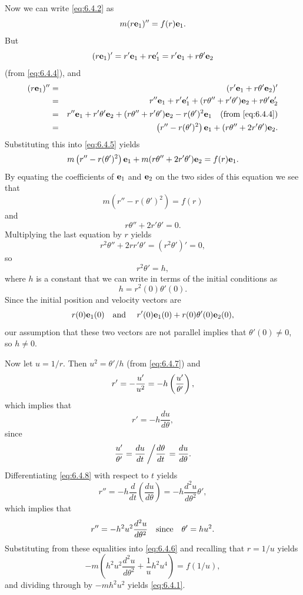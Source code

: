 Now we can write \eqref{eq:6.4.2} as
\begin{equation}
  \label{eq:6.4.5}m(r{\bf e}_{1})''=f(r){\bf e}_{1}.
\end{equation}
But
\[
  (r{\bf e}_{1})'=r'{\bf e}_{1}+r{\bf e}_{1}'=r'{\bf e}_{1}+r\theta'{\bf e}_{2}
\]
(from \eqref{eq:6.4.4}), and
\begin{eqnarray*}
  (r{\bf e}_{1})'' & = & (r'{\bf e}_{1}+r\theta'{\bf e}_{2})'                                                                                               \\
                   & = & r''{\bf e}_{1}+r'{\bf e}_{1}'+(r\theta''+r'\theta'){\bf e}_{2}+r\theta'{\bf e}_{2}'                                                \\
                   & = & r''{\bf e}_{1}+r'\theta'{\bf e}_{2}+(r\theta''+r'\theta'){\bf e}_{2}-r(\theta')^{2}{\bf e}_{1}\mbox{\quad (from \eqref{eq:6.4.4})} \\
                   & = & \left(r''-r(\theta')^{2}\right){\bf e}_{1}+(r\theta''+2r'\theta'){\bf e}_{2}.
\end{eqnarray*}
Substituting this into \eqref{eq:6.4.5} yields
\[
  m\left(r''-r(\theta')^{2}\right){\bf e}_{1}+m(r\theta''+2r'\theta'){\bf e}_{2}=f(r){\bf e}_{1}.
\]
By equating the coefficients of ${\bf e}_{1}$ and ${\bf e}_{2}$ on the two sides of this equation we
see that
\begin{equation}
  \label{eq:6.4.6}m\left(r''-r(\theta')^{2}\right)=f(r)
\end{equation}
and
\[
  r\theta''+2r'\theta'=0.
\]
Multiplying the last equation by $r$ yields
\[
  r^{2}\theta''+2rr'\theta'=(r^{2}\theta')'=0,
\]
so
\begin{equation}
  \label{eq:6.4.7}r^{2}\theta'=h,
\end{equation}
where $h$ is a constant that we can write in terms of the initial conditions as
\[
  h=r^{2}(0)\theta'(0).
\]
Since the initial position and velocity vectors are
\[
  r(0){\bf e}_{1}(0)\mbox{\quad and \quad}r'(0){\bf e}_{1}(0)+r(0)\theta'(0){\bf e}_{2}(0),
\]
our assumption that these two vectors are not parallel implies that $\theta'(0)\ne0$, so $h\ne0$.

Now let $u=1/r$. Then $u^{2}=\theta'/h$ (from \eqref{eq:6.4.7}) and
\[
  r'=-\displaystyle\frac{u'}{u^{2}}=-h\left(\frac{u'}{\theta'}\right),
\]
which implies that
\begin{equation}
  \label{eq:6.4.8}r'=-h\frac{du}{d\theta},
\end{equation}
since
\[
  \frac{u'}{\theta'}=\frac{du}{dt}\left/\frac{d\theta}{dt}\right.= \frac{du}{d\theta}.
\]
Differentiating \eqref{eq:6.4.8} with respect to $t$ yields
\[
  r''=-h\frac{d}{dt}\left(\frac{du}{d\theta}\right) =-h\frac{d^{2}u}{d\theta^{2}}\theta',
\]
which implies that
\[
  r''=-h^{2}u^{2}\frac{d^{2}u}{d\theta^{2}}\mbox{\quad since\quad}\theta'=hu^{2}.
\]
Substituting from these equalities into \eqref{eq:6.4.6} and recalling that $r=1/u$ yields
\[
  -m\left(h^{2}u^{2}\frac{d^{2}u}{d\theta^{2}}+\frac{1}{u}h^{2}u^{4}\right) =f(1/u),
\]
and dividing through by $-mh^{2}u^{2}$ yields \eqref{eq:6.4.1}.

